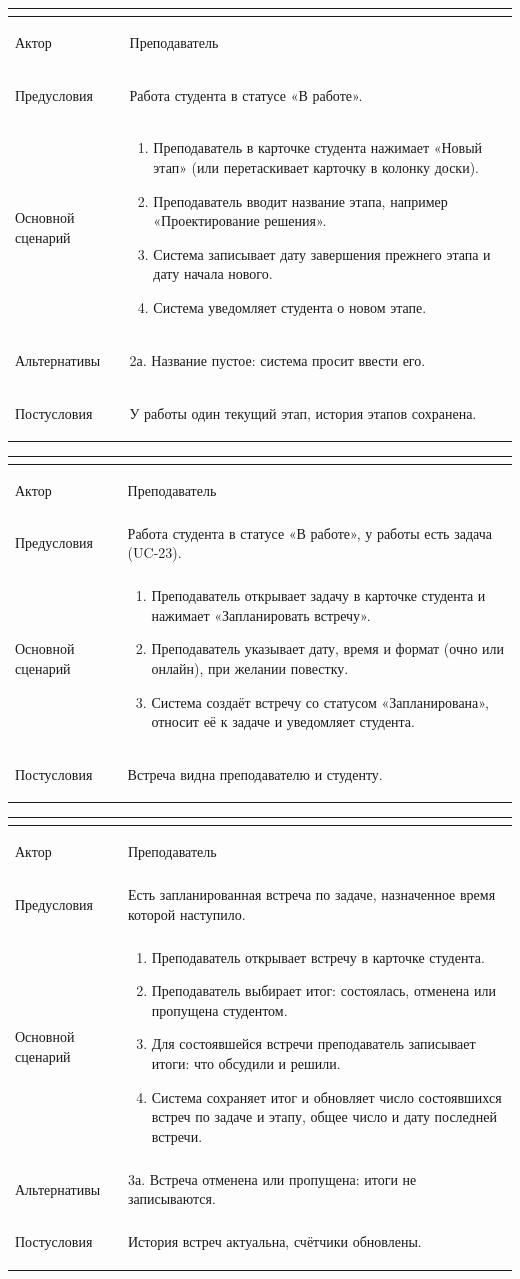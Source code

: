 \documentclass[a4paper,12pt]{article}
\newenvironment{ucd}[3]{%
  \needspace{10\baselineskip}
  \begin{longtable}{|>{\bfseries\raggedright\arraybackslash}p{3.0cm}|p{11.8cm}|}
  \hline
  \multicolumn{2}{|l|}{\textbf{#1.\ #2}}\\ \hline
  Актор & #3\\ \hline
}{\end{longtable}}
\newcommand{\steps}[1]{\begin{enumerate}[nosep,leftmargin=*]#1\end{enumerate}}
\begin{document}
\begin{ucd}{UC-20}{Создать новый этап работы}{Преподаватель}
Предусловия & Работа студента в статусе «В работе».\\ \hline
Основной сценарий & \steps{
 \item Преподаватель в карточке студента нажимает «Новый этап» (или перетаскивает карточку в колонку доски).
 \item Преподаватель вводит название этапа, например «Проектирование решения».
 \item Система записывает дату завершения прежнего этапа и дату начала нового.
 \item Система уведомляет студента о новом этапе.}\\ \hline
Альтернативы & 2а. Название пустое: система просит ввести его.\\ \hline
Постусловия & У работы один текущий этап, история этапов сохранена.\\ \hline
\end{ucd}

\begin{ucd}{UC-21}{Запланировать встречу по задаче}{Преподаватель}
Предусловия & Работа студента в статусе «В работе», у работы есть задача (UC-23).\\ \hline
Основной сценарий & \steps{
 \item Преподаватель открывает задачу в карточке студента и нажимает «Запланировать встречу».
 \item Преподаватель указывает дату, время и формат (очно или онлайн), при желании повестку.
 \item Система создаёт встречу со статусом «Запланирована», относит её к задаче и уведомляет студента.}\\ \hline
Постусловия & Встреча видна преподавателю и студенту.\\ \hline
\end{ucd}

\begin{ucd}{UC-22}{Отметить итог встречи и записать результаты}{Преподаватель}
Предусловия & Есть запланированная встреча по задаче, назначенное время которой наступило.\\ \hline
Основной сценарий & \steps{
 \item Преподаватель открывает встречу в карточке студента.
 \item Преподаватель выбирает итог: состоялась, отменена или пропущена студентом.
 \item Для состоявшейся встречи преподаватель записывает итоги: что обсудили и решили.
 \item Система сохраняет итог и обновляет число состоявшихся встреч по задаче и этапу, общее число и дату последней встречи.}\\ \hline
Альтернативы & 3а. Встреча отменена или пропущена: итоги не записываются.\\ \hline
Постусловия & История встреч актуальна, счётчики обновлены.\\ \hline
\end{ucd}
\end{document}
